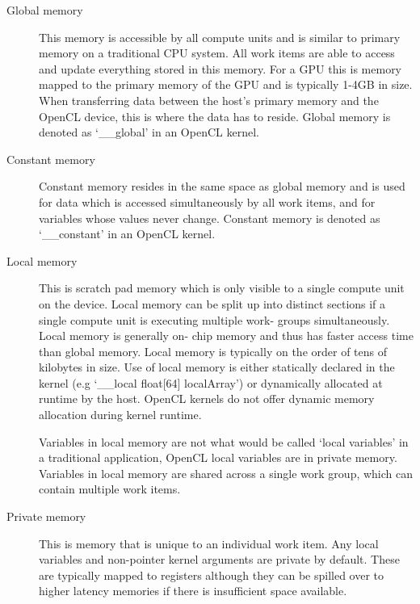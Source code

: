 \begin{description}

\item[Global memory] This memory is accessible by all compute units and is
similar to primary memory on a traditional CPU system. All work items are able
to access and update everything stored in this memory. For a GPU this is memory
mapped to the primary memory of the GPU and is typically 1-4GB in size. When
transferring data between the host's primary memory and the OpenCL device, this
is where the data has to reside. Global memory is denoted as `\_\_global' in an
OpenCL kernel.

\item[Constant memory] Constant memory resides in the same space as global
memory and is used for data which is accessed simultaneously by all work items,
and for variables whose values never change. Constant memory is denoted as
`\_\_constant' in an OpenCL kernel.

\item[Local memory] This is scratch pad memory which is only visible to a single
compute unit on the device. Local memory can be split up into distinct sections
if a single compute unit is executing multiple work- groups simultaneously.
Local memory is generally on- chip memory and thus has faster access time than
global memory. Local memory is typically on the order of tens of kilobytes in
size. Use of local memory is either statically declared in the kernel (e.g
`\_\_local float[64] localArray') or dynamically allocated at runtime by the
host. OpenCL kernels do not offer dynamic memory allocation during kernel
runtime.

Variables in local memory are not what would be called `local variables' in a
traditional application, OpenCL local variables are in private memory. Variables
in local memory are shared across a single work group, which can contain
multiple work items.

\item[Private memory] This is memory that is unique to an individual work item.
Any local variables and non-pointer kernel arguments are private by default.
These are typically mapped to registers although they can be spilled over to
higher latency memories if there is insufficient space available.

\end{description}

